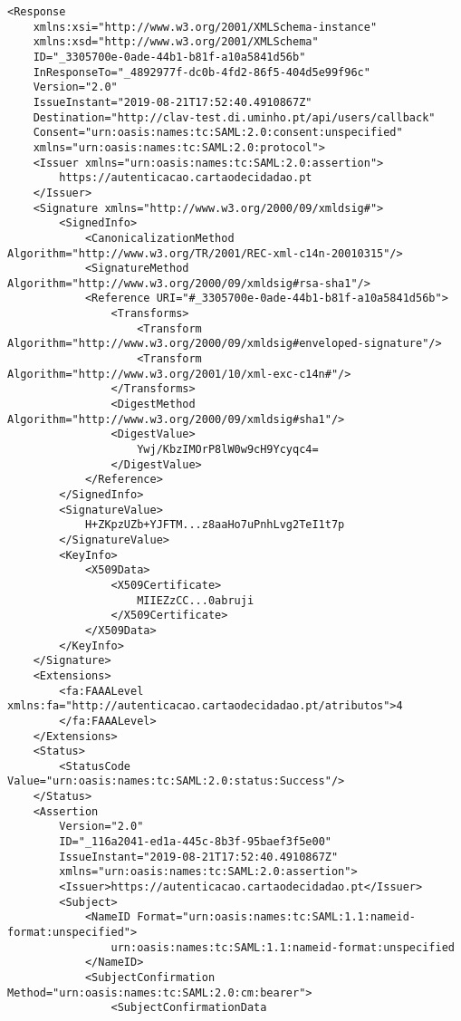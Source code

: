 \begin{lstlisting}
<Response 
    xmlns:xsi="http://www.w3.org/2001/XMLSchema-instance" 
    xmlns:xsd="http://www.w3.org/2001/XMLSchema" 
    ID="_3305700e-0ade-44b1-b81f-a10a5841d56b" 
    InResponseTo="_4892977f-dc0b-4fd2-86f5-404d5e99f96c" 
    Version="2.0" 
    IssueInstant="2019-08-21T17:52:40.4910867Z" 
    Destination="http://clav-test.di.uminho.pt/api/users/callback" 
    Consent="urn:oasis:names:tc:SAML:2.0:consent:unspecified" 
    xmlns="urn:oasis:names:tc:SAML:2.0:protocol">
    <Issuer xmlns="urn:oasis:names:tc:SAML:2.0:assertion">
        https://autenticacao.cartaodecidadao.pt
    </Issuer>
    <Signature xmlns="http://www.w3.org/2000/09/xmldsig#">
        <SignedInfo>
            <CanonicalizationMethod Algorithm="http://www.w3.org/TR/2001/REC-xml-c14n-20010315"/>
            <SignatureMethod Algorithm="http://www.w3.org/2000/09/xmldsig#rsa-sha1"/>
            <Reference URI="#_3305700e-0ade-44b1-b81f-a10a5841d56b">
                <Transforms>
                    <Transform Algorithm="http://www.w3.org/2000/09/xmldsig#enveloped-signature"/>
                    <Transform Algorithm="http://www.w3.org/2001/10/xml-exc-c14n#"/>
                </Transforms>
                <DigestMethod Algorithm="http://www.w3.org/2000/09/xmldsig#sha1"/>
                <DigestValue>
                    Ywj/KbzIMOrP8lW0w9cH9Ycyqc4=
                </DigestValue>
            </Reference>
        </SignedInfo>
        <SignatureValue>
            H+ZKpzUZb+YJFTM...z8aaHo7uPnhLvg2TeI1t7p
        </SignatureValue>
        <KeyInfo>
            <X509Data>
                <X509Certificate>
                    MIIEZzCC...0abruji
                </X509Certificate>
            </X509Data>
        </KeyInfo>
    </Signature>
    <Extensions>
        <fa:FAAALevel xmlns:fa="http://autenticacao.cartaodecidadao.pt/atributos">4
        </fa:FAAALevel>
    </Extensions>
    <Status>
        <StatusCode Value="urn:oasis:names:tc:SAML:2.0:status:Success"/>
    </Status>
    <Assertion 
        Version="2.0" 
        ID="_116a2041-ed1a-445c-8b3f-95baef3f5e00" 
        IssueInstant="2019-08-21T17:52:40.4910867Z" 
        xmlns="urn:oasis:names:tc:SAML:2.0:assertion">
        <Issuer>https://autenticacao.cartaodecidadao.pt</Issuer>
        <Subject>
            <NameID Format="urn:oasis:names:tc:SAML:1.1:nameid-format:unspecified">
                urn:oasis:names:tc:SAML:1.1:nameid-format:unspecified
            </NameID>
            <SubjectConfirmation Method="urn:oasis:names:tc:SAML:2.0:cm:bearer">
                <SubjectConfirmationData 

\end{lstlisting}
